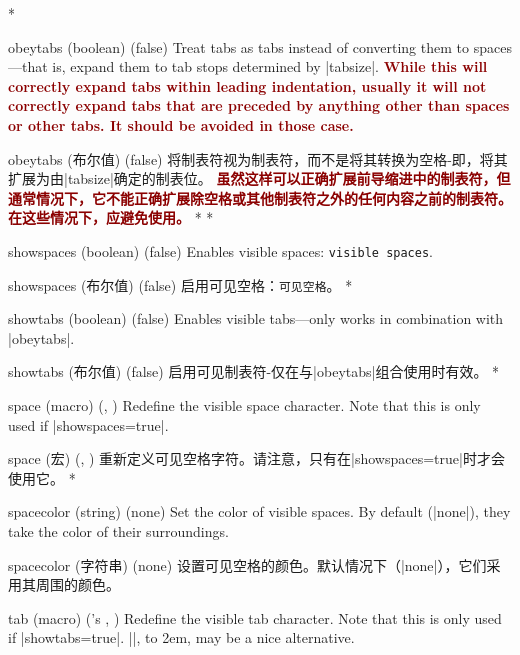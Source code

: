 \begin{optionlist}
\begin{paracol}{2}
\switchcolumn[0]*%
\item[obeytabs (boolean) (false)]
Treat tabs as tabs instead of converting them to spaces---that is, expand them to tab stops determined by |tabsize|.  \textcolor{DarkRed}{\textbf{While this will correctly expand tabs within leading indentation, usually it will not correctly expand tabs that are preceded by anything other than spaces or other tabs.  It should be avoided in those case.}}
\switchcolumn
\item[obeytabs (布尔值) (false)]
将制表符视为制表符，而不是将其转换为空格-即，将其扩展为由|tabsize|确定的制表位。 \textcolor{DarkRed}{\textbf{虽然这样可以正确扩展前导缩进中的制表符，但通常情况下，它不能正确扩展除空格或其他制表符之外的任何内容之前的制表符。在这些情况下，应避免使用。}}
\switchcolumn[0]*%
\switchcolumn[0]*%
\item[showspaces (boolean) (false)]
Enables visible spaces: \verb*/visible spaces/.
\switchcolumn
\item[showspaces (布尔值) (false)]
启用可见空格：\verb*/可见空格/。
\switchcolumn[0]*%
\item[showtabs (boolean) (false)]
Enables visible tabs---only works in combination with |obeytabs|.
\switchcolumn
\item[showtabs (布尔值) (false)]
启用可见制表符-仅在与|obeytabs|组合使用时有效。
\switchcolumn[0]*%
\item[space (macro) (\string\textvisiblespace, \textvisiblespace)]
Redefine the visible space character.  Note that this is only used if |showspaces=true|.
\switchcolumn
\item[space (宏) (\string\textvisiblespace, \textvisiblespace)]
重新定义可见空格字符。请注意，只有在|showspaces=true|时才会使用它。
\switchcolumn[0]*%
\item[spacecolor (string) (none)]
Set the color of visible spaces.  By default (|none|), they take the color of their surroundings.
\switchcolumn
\item[spacecolor (字符串) (none)]
设置可见空格的颜色。默认情况下（|none|），它们采用其周围的颜色。
\item[tab (macro) ({\rmfamily\pkg{fancyvrb}'s} \string\FancyVerbTab, \FancyVerbTab)]
Redefine the visible tab character.  Note that this is only used if |showtabs=true|.  |\rightarrowfill|, \hbox to 2em{\rightarrowfill}, may be a nice alternative.

\end{paracol}
\end{optionlist}
